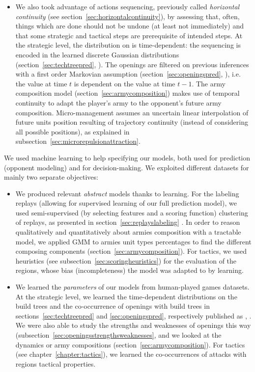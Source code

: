 \begin{itemize}
    \item We also took advantage of actions sequencing, previously called \textit{horizontal continuity} (see section~\ref{sec:horizontalcontinuity}), by assessing that, often, things which are done should not be undone (at least not immediately) and that some strategic and tactical steps are prerequisite of intended steps. At the strategic level, the distribution on  is time-dependent: the sequencing is encoded in the learned discrete Gaussian distributions (section~\ref{sec:techtreepred}, \citep{SYNNAEVE:StratPred}). The openings are filtered on previous inferences with a first order Markovian assumption (section~\ref{sec:openingspred}, \citep{SYNNAEVE:OpeningPred}), i.e. the value at time $t$ is dependent on the value at time $t-1$. The army composition model (section~\ref{sec:armycomposition}) makes use of temporal continuity to adapt the player's army to the opponent's future army composition. %
Micro-management assumes an uncertain linear interpolation of future units position resulting of trajectory continuity (instead of considering all possible positions), as explained in subsection~\ref{sec:microrepulsionattraction}.
\end{itemize}

We used machine learning to help specifying our models, both used for prediction (opponent modeling) and for decision-making. We exploited different datasets for mainly two separate objectives:
\begin{itemize}
    \item We produced relevant \textit{abstract} models thanks to learning. For the labeling replays (allowing for supervised learning of our full  prediction model), we used semi-supervised (by selecting features and a scoring function)  clustering of replays, as presented in section~\ref{sec:replayslabeling} \citep{SYNNAEVE:OpeningPred}. In order to reason qualitatively and quantitatively about armies composition with a tractable model, we applied GMM to armies unit types percentages to find the different composing components (section~\ref{sec:armycomposition}). For tactics, we used heuristics (see subsection~\ref{sec:scoringheuristics}) for the evaluation of the regions, whose bias (incompleteness) the model was adapted to by learning.
    
    \item We learned the \textit{parameters} of our models from human-played games datasets. At the strategic level, we learned the time-dependent distributions on the build trees and the co-occurrence of openings with build trees in sections~\ref{sec:techtreepred} and \ref{sec:openingspred}, respectively published as \citep{SYNNAEVE:StratPred}, \citep{SYNNAEVE:OpeningPred}. We were also able to study the strengths and weaknesses of openings this way (subsection~\ref{sec:openingsstrengthsweaknesses}, and we looked at the dynamics or army compositions (section~\ref{sec:armycomposition}). For tactics (see chapter~\ref{chapter:tactics}), we learned the co-occurrences of attacks with regions tactical properties.
\end{itemize}

